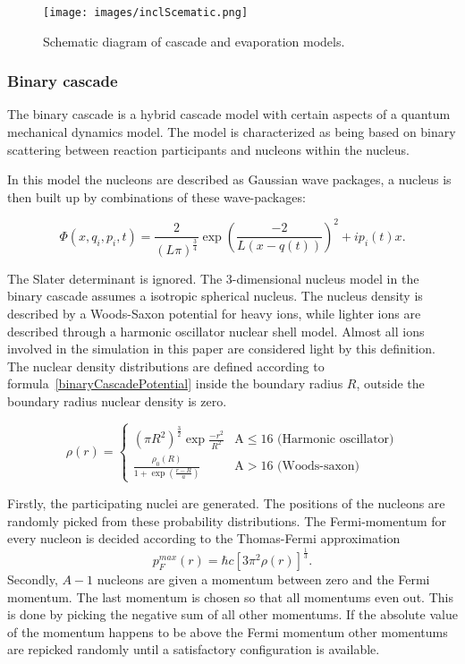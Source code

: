 \begin{figure}[h]
\begin{center}
\texttt{[image: images/inclScematic.png]}  
\caption{\label{fig:inclschematic} Schematic diagram of cascade and evaporation models.}
 
 \end{center}
 \end{figure}

\subsubsection{Binary cascade}
The binary cascade is a hybrid cascade model with certain aspects of a quantum mechanical dynamics model. The model is characterized as being based on binary scattering between reaction participants and nucleons within the nucleus.

In this model the nucleons are described as Gaussian wave packages, a nucleus is then built up by combinations of these wave-packages:


\begin{equation}
\Phi(x,q_i,p_i,t) = \frac{2}{(L\pi)^{\frac{3}{4}}}\exp{(\frac{-2}{L(x - q(t))})^2+ip_i(t)x}.
\label{wavePackage}
\end{equation}


The Slater determinant is ignored. The 3-dimensional nucleus model in the binary cascade assumes a isotropic spherical nucleus. The nucleus density is described by a Woods-Saxon potential for heavy ions, while lighter ions are described through a harmonic oscillator nuclear shell model. Almost all ions involved in the simulation in this paper are considered light by this definition. The nuclear density distributions are defined according to formula~\ref{binaryCascadePotential} inside the boundary radius $R$, outside the boundary radius nuclear density is zero.

\begin{equation}
\rho(r) = 
\begin{cases}
(\pi R^2)^{\frac{3}{2}}\exp{\frac{-r^2}{R^2}} & \text{A} \le 16 \text{  (Harmonic oscillator)}\\
\frac{\rho_{0}(R)}{1+\exp({\frac{r-R}{a}})} & \text{A} > 16 \text{  (Woods-saxon)}
\end{cases}
\label{binaryCascadePotential}
\end{equation}

Firstly, the participating nuclei are generated. The positions of the nucleons are randomly picked from these probability distributions. The Fermi-momentum for every nucleon is decided according to the Thomas-Fermi approximation \begin{equation}p^{max}_F(r) = \hbar c [3 \pi^2 \rho(r)]^\frac{1}{3}.\end{equation}Secondly, $A-1$ nucleons are given a momentum between zero and the Fermi momentum. The last momentum is chosen so that all momentums even out. This is done by picking the negative sum of all other momentums. If the absolute value of the momentum happens to be above the Fermi momentum other momentums are repicked randomly until a satisfactory configuration is available.

